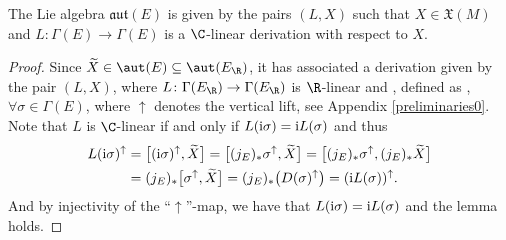  \begin{Lemma} The Lie algebra $\mathfrak{aut}(E)$ is given by the pairs $(L,X)$ such that $X\in \mathfrak{X}(M)$ and $L\colon \Gamma (E)\to \Gamma (E)$ is a $\C$-linear derivation with respect to $X$.
 \end{Lemma}
\begin{proof}
Since $\widetilde{X}\in \aut(E)\subseteq \aut (E_{\R})$, it has associated a derivation given by the pair $(L, X)$, where $L\colon \Gamma(E_{\R})\to \Gamma(E_{\R})$ is $\R$-linear and , defined as , ${\forall \sigma\in \Gamma(E)}$, where $\uparrow$ denotes the vertical lift, see Appendix \ref{preliminaries0}. Note that $L$ is $\C$-linear if and only if $L({\rm i}\sigma)={\rm i}L(\sigma)$ and thus
\begin{align*}
L({\rm i}\sigma)^{\uparrow}&{}=\bigl[({\rm i}\sigma)^{\uparrow}, \widetilde{X}\bigr]=\bigl[(j_{E})_* \sigma^{\uparrow}, \widetilde{X}\bigr]=\bigl[(j_{E})_* \sigma^{\uparrow},(j_{E})_* \widetilde{X}\bigr]\\
&{}=(j_E)_* \bigl[\sigma^{\uparrow}, \widetilde{X}\bigr]=(j_{E})_* \bigl(D(\sigma)^{\uparrow}\bigr)=({\rm i}L(\sigma))^{\uparrow}.
\end{align*}
And by injectivity of the ``$\uparrow$''-map, we have that $L({\rm i}\sigma)={\rm i}L(\sigma)$ and the lemma holds.
\end{proof}

